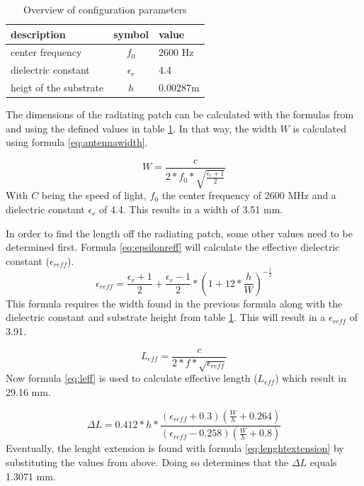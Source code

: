 \begin{table}[h!]
\centering
\begin{tabular}{|l|c|l|}
\hline
 description            & symbol          & value         \\    \hline
 center frequency       & $f_0$           & 2600 Hz       \\ 
 dielectric constant    & $\epsilon_r$    & 4.4         \\ 
 heigt of the substrate & $h$             & 0.00287m    \\ \hline
\end{tabular}
\caption{Overview of configuration parameters}
\label{table:antennaparas}
\end{table}

The dimensions of the radiating patch can be calculated with the formulas from \cite{J14_antennadesign} and \cite{J15_antennadesign}
using the defined values in table \ref{table:antennaparas}. In that way, the width $W$ is calculated using formula \ref{eq:antennawidth}.

\begin{equation} 
W = \frac{c}{2*f_0*\sqrt{\frac{\epsilon_r+1}{2}}}
\label{eq:antennawidth}
\end{equation}
With $C$ being the speed of light, $f_0$ the center frequency of 2600 MHz and a dielectric constant $\epsilon_r$ of 4.4. This results 
in a width of 3.51 mm.

In order to find the length off the radiating patch, some other values need to be determined first. Formula \ref{eq:epsilonreff} will
calculate the effective dielectric constant ($\epsilon_{reff}$).
\begin{equation} 
\epsilon_{reff} = \frac{\epsilon_r+1}{2}+  \frac{\epsilon_r-1}{2} * \left(1+12*\frac{h}{W}\right)^{-\frac{1}{2}}
\label{eq:epsilonreff}
\end{equation}
This formula requires the width found in the previous formula along with the dielectric constant and substrate height from table \ref{table:antennaparas}.
This will result in a $\epsilon_{reff}$ of 3.91.

\begin{equation} 
L_{eff} = \frac{c}{2*f*\sqrt{\epsilon_{reff}}}
\label{eq:leff}
\end{equation}
Now formula \ref{eq:leff} is used to calculate effective length ($L_{eff}$) which result in 29.16 mm.

\begin{equation} 
\Delta L = 0.412*h*\frac{(\epsilon_{reff}+0.3)\left(\frac{W}{h}+0.264\right)}{\left(\epsilon_{reff}-0.258\right)\left(\frac{W}{h}+0.8\right)}
\label{eq:lenghtextension}
\end{equation}
Eventually, the lenght extension is found with formula \ref{eq:lenghtextension} by substituting the values from above.
Doing so determines that the $\Delta L$ equals 1.3071 mm.

